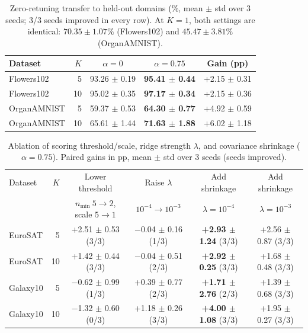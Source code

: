 \documentclass[letterpaper]{article} %
\newcommand{\nmin}{n_{\min}}
\begin{document}
\begin{table}[t]
\centering
\footnotesize
\setlength{\tabcolsep}{2.5pt}
\begin{tabular}{@{}lrccc@{}}
\toprule
Dataset & $K$ & $\alpha{=}0$ & $\alpha{=}0.75$ & Gain (pp) \\
\midrule
Flowers102 & 5 & 93.26 $\pm$ 0.19 & \textbf{95.41 $\pm$ 0.44} & +2.15 $\pm$ 0.31 \\
Flowers102 & 10 & 95.02 $\pm$ 0.35 & \textbf{97.17 $\pm$ 0.34} & +2.15 $\pm$ 0.36 \\
OrganAMNIST & 5 & 59.37 $\pm$ 0.53 & \textbf{64.30 $\pm$ 0.77} & +4.92 $\pm$ 0.59 \\
OrganAMNIST & 10 & 65.61 $\pm$ 1.44 & \textbf{71.63 $\pm$ 1.88} & +6.02 $\pm$ 1.18 \\
\bottomrule
\end{tabular}
\caption{Zero-retuning transfer to held-out domains (\%, mean $\pm$ std over 3 seeds; 3/3 seeds improved in every row). At $K=1$, both settings are identical: $70.35 \pm 1.07\%$ (Flowers102) and $45.47 \pm 3.81\%$ (OrganAMNIST).}
\label{tab:transfer}
\end{table}

\begin{table}[t]
\centering
\small
\begin{tabular}{@{}lrcccc@{}}
\toprule
Dataset & $K$ & Lower threshold & Raise $\lambda$ & Add shrinkage & Add shrinkage \\
 & & {\footnotesize $\nmin\ 5{\to}2$, scale $5{\to}1$} & {\footnotesize $10^{-4}{\to}10^{-3}$} & {\footnotesize $\lambda = 10^{-4}$} & {\footnotesize $\lambda = 10^{-3}$} \\
\midrule
EuroSAT & 5 & +2.51 $\pm$ 0.53 (3/3) & $-$0.04 $\pm$ 0.16 (1/3) & \textbf{+2.93 $\pm$ 1.24} (3/3) & +2.56 $\pm$ 0.87 (3/3) \\
EuroSAT & 10 & +1.42 $\pm$ 0.44 (3/3) & $-$0.04 $\pm$ 0.51 (2/3) & \textbf{+2.92 $\pm$ 0.25} (3/3) & +1.68 $\pm$ 0.48 (3/3) \\
Galaxy10 & 5 & $-$0.62 $\pm$ 0.99 (1/3) & +0.39 $\pm$ 0.77 (2/3) & \textbf{+1.71 $\pm$ 2.76} (2/3) & +1.39 $\pm$ 0.68 (3/3) \\
Galaxy10 & 10 & $-$1.32 $\pm$ 0.60 (0/3) & +1.18 $\pm$ 0.26 (3/3) & \textbf{+4.00 $\pm$ 1.08} (3/3) & +1.95 $\pm$ 0.27 (3/3) \\
\bottomrule
\end{tabular}
\caption{Ablation of scoring threshold/scale, ridge strength $\lambda$, and covariance shrinkage ($\alpha = 0.75$). Paired gains in pp, mean $\pm$ std over 3 seeds (seeds improved).}
\label{tab:ablation}
\end{table}
\end{document}
